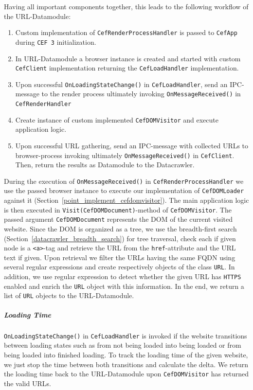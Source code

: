 Having all important components together, this leads to the following workflow of the URL-Datamodule:

\begin{enumerate}
	\item Custom implementation of \texttt{CefRenderProcessHandler} is passed to \texttt{CefApp} during \texttt{CEF 3} initialization.
	\item In URL-Datamodule a browser instance is created and started with custom \texttt{CefClient} implementation returning the \texttt{CefLoadHandler} implementation.
	\item Upon successful \texttt{OnLoadingStateChange()} in \texttt{CefLoadHandler}, send an IPC-message to the render process ultimately invoking \texttt{OnMessageReceived()} in \texttt{CefRenderHandler}
	\item Create instance of custom implemented \texttt{CefDOMVisitor} and execute application logic.
	\label{point_implement_cefdomvisitor}
	\item Upon successful URL gathering, send an IPC-message with collected URLs to browser-process invoking ultimately \texttt{OnMessageReceived()} in \texttt{CefClient}. Then, return the results as Datamodule to the Datacrawler.
\end{enumerate}  

During the execution of \texttt{OnMessageReceived()} in \texttt{CefRenderProcessHandler} we use the passed browser instance to execute our implementation of \texttt{CefDOMLoader} against it (Section~\ref{point_implement_cefdomvisitor}). The main application logic is then executed in \texttt{Visit(CefDOMDocument)}-method of \texttt{CefDOMVisitor}. The passed argument \texttt{CefDOMDocument} represents the DOM of the current visited website. Since the DOM is organized as a tree, we use the breadth-first search (Section~\ref{datacrawler_breadth_search}) for tree traversal, check each if given node is a \texttt{<a>}-tag and retrieve the URL from the \texttt{href}-attribute and the URL text if given. Upon retrieval we filter the URLs having the same FQDN using several regular expressions and create respectively objects of the class \texttt{URL}. In addition, we use regular expression to detect whether the given URL has \texttt{HTTPS} enabled and enrich the \texttt{URL} object with this information. In the end, we return a list of \texttt{URL} objects to the URL-Datamodule.

\subparagraph*{Loading Time}
\texttt{OnLoadingStateChange()} in \texttt{CefLoadHandler} is invoked if the website transitions between loading states such as from not being loaded into being loaded or from being loaded into finished loading. To track the loading time of the given website, we just stop the time between both transitions and calculate the delta. We return the loading time back to the URL-Datamodule upon \texttt{CefDOMVisitor} has returned the valid URLs.

